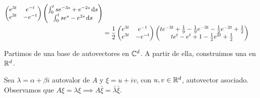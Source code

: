 \begin{ejem}
\[\begin{aligned}
\begin{pmatrix}
				                                                                                                                                        e^{3t} & e^{-t}  \\
				                                                                                                                                        e^{3t} & -e^{-t}
			                                                                                                                                        \end{pmatrix} \begin{pmatrix}
				                                                                                                                                                      \int_{0}^{t} s e^{-3s} + e^{-2s} \odif{s} \\
				                                                                                                                                                      \int_{0}^{t} s e^{s} - e^{2s} \odif{s}
			                                                                                                                                                      \end{pmatrix} \\
			             & = \frac{1}{2} \begin{pmatrix}
				                             e^{3t} & e^{-t}  \\
				                             e^{3t} & -e^{-t}
			                             \end{pmatrix} \begin{pmatrix}
				                                           te^{-3t} + \frac{1}{9} - \frac{1}{9} e^{-3t} -\frac{1}{2}e^{-2t} + \frac{1}{2} \\
				                                           te^{t} - e^{t} + 1 - \frac{1}{2}e^{2t} + \frac{1}{2}
			                                           \end{pmatrix}
		\end{aligned}\]
\end{ejem}



Partimos de una base de autovectores en $\mathbb{C}^d$. A partir de ella, construimos una en $\mathbb{R}^d$.

Sea $\lambda = \alpha + \beta i$ autovalor de $A$ y $\xi = u + i v$, con $u, v \in \mathbb{R}^d$, autovector asociado. Observamos que $A\xi = \lambda \xi \implies A \bar{\xi} = \bar{\lambda} \bar{\xi}$.

